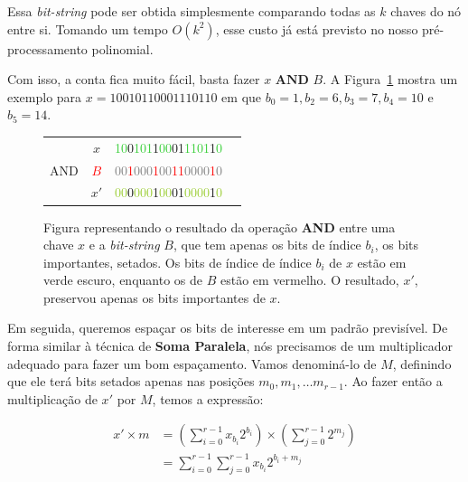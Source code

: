 Essa \textit{bit-string} pode ser obtida simplesmente comparando todas as $k$
chaves do nó entre si. Tomando um tempo $O(k^2)$, esse custo já está previsto no
nosso pré-processamento polinomial.

Com isso, a conta fica muito fácil, basta fazer $x \textbf{ AND } B$. A
Figura~\ref{f:fusion-approx-sketch-and} mostra um exemplo para
$x=10010110001110110$ em que $b_0=1,b_2=6,b_3=7,b_4=10$ e $b_5=14$.

\begin{figure}[h]
\centering
{
\bfseries\Large
\begin{tabular}{cccc}
& \textcolor{PineGreen}{$x$} &
\textcolor{LimeGreen}{10}\textcolor{PineGreen}{0}\textcolor{LimeGreen}{101}\textcolor{PineGreen}{1}\textcolor{LimeGreen}{00}\textcolor{PineGreen}{01}\textcolor{LimeGreen}{1101}\textcolor{PineGreen}{1}\textcolor{LimeGreen}{0}   \\
AND & \textcolor{Red}{$B$} &
\textcolor{Gray}{00}\textcolor{Red}{1}\textcolor{Gray}{000}\textcolor{Red}{1}\textcolor{Gray}{00}\textcolor{Red}{11}\textcolor{Gray}{0000}\textcolor{Red}{1}\textcolor{Gray}{0}  \\
      \hline
& \textcolor{PineGreen}{$x'$} &
\textcolor{YellowGreen}{00}\textcolor{PineGreen}{0}\textcolor{YellowGreen}{000}\textcolor{PineGreen}{1}\textcolor{YellowGreen}{00}\textcolor{PineGreen}{01}\textcolor{YellowGreen}{0000}\textcolor{PineGreen}{1}\textcolor{YellowGreen}{0}
\end{tabular}
} 
\caption{Figura representando o resultado da operação \textbf{AND} entre uma
chave $x$ e a \textit{bit-string} $B$, que tem apenas os bits de índice $b_i$,
os bits importantes, setados. Os bits de índice de índice $b_i$ de $x$ estão em
verde escuro, enquanto os de $B$ estão em vermelho. O resultado, $x'$, preservou
apenas os bits importantes de $x$.\label{f:fusion-approx-sketch-and}}
\end{figure}

Em seguida, queremos espaçar os bits de interesse em um padrão previsível. De
forma similar à técnica de \textbf{Soma Paralela}, nós precisamos de um
multiplicador adequado para fazer um bom espaçamento. Vamos denominá-lo de $M$,
definindo que ele terá bits setados apenas nas posições $m_0,m_1,\dots m_{r-1}$.
Ao fazer então a multiplicação de $x'$ por $M$, temos a expressão:

\begin{align}
x' \times m & = \left( \sum_{i=0}^{r-1} x_{b_i}2^{b_i} \right) \times \left( \sum_{j=0}^{r-1}2^{m_j} \right) \\
              & =  \sum_{i=0}^{r-1}\sum_{j=0}^{r-1} x_{b_i}2^{b_i+m_j} 
\end{align}

